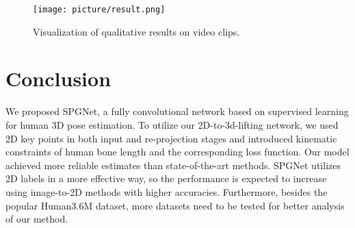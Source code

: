 \documentclass[runningheads]{llncs}
\begin{document}
\begin{figure}[!htp]
\texttt{[image: picture/result.png]}
\caption{Visualization of qualitative results on video clips.} \label{fig2}
\end{figure}

\section{Conclusion}
We proposed SPGNet, a fully convolutional network based on supervised learning for human 3D pose estimation. To utilize our 2D-to-3d-lifting network, we used 2D key points in both input and re-projection stages and introduced kinematic constraints of human bone length and the corresponding loss function. Our model achieved more reliable estimates than state-of-the-art methods. SPGNet utilizes 2D labels in a more effective way, so the performance is expected to increase using image-to-2D methods with higher accuracies. Furthermore, besides the popular Human3.6M dataset, more datasets need to be tested for better analysis of our method.





\end{document}
